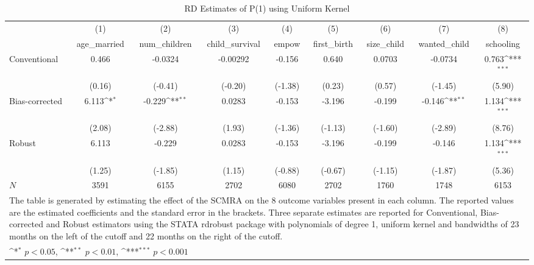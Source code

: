 \begin{table}[htbp]\centering
\def\sym#1{\ifmmode^{#1}\else\(^{#1}\)\fi}
\caption{RD Estimates of P(1) using Uniform Kernel}
\begin{tabular}{l*{8}{c}}
\toprule
            &\multicolumn{1}{c}{(1)}&\multicolumn{1}{c}{(2)}&\multicolumn{1}{c}{(3)}&\multicolumn{1}{c}{(4)}&\multicolumn{1}{c}{(5)}&\multicolumn{1}{c}{(6)}&\multicolumn{1}{c}{(7)}&\multicolumn{1}{c}{(8)}\\
            &\multicolumn{1}{c}{age\_married}&\multicolumn{1}{c}{num\_children}&\multicolumn{1}{c}{child\_survival}&\multicolumn{1}{c}{empow}&\multicolumn{1}{c}{first\_birth}&\multicolumn{1}{c}{size\_child}&\multicolumn{1}{c}{wanted\_child}&\multicolumn{1}{c}{schooling}\\
\midrule
Conventional&       0.466         &     -0.0324         &    -0.00292         &      -0.156         &       0.640         &      0.0703         &     -0.0734         &       0.763\sym{***}\\
            &      (0.16)         &     (-0.41)         &     (-0.20)         &     (-1.38)         &      (0.23)         &      (0.57)         &     (-1.45)         &      (5.90)         \\
\addlinespace
Bias-corrected&       6.113\sym{*}  &      -0.229\sym{**} &      0.0283         &      -0.153         &      -3.196         &      -0.199         &      -0.146\sym{**} &       1.134\sym{***}\\
            &      (2.08)         &     (-2.88)         &      (1.93)         &     (-1.36)         &     (-1.13)         &     (-1.60)         &     (-2.89)         &      (8.76)         \\
\addlinespace
Robust      &       6.113         &      -0.229         &      0.0283         &      -0.153         &      -3.196         &      -0.199         &      -0.146         &       1.134\sym{***}\\
            &      (1.25)         &     (-1.85)         &      (1.15)         &     (-0.88)         &     (-0.67)         &     (-1.15)         &     (-1.87)         &      (5.36)         \\
\midrule
\(N\)       &        3591         &        6155         &        2702         &        6080         &        2702         &        1760         &        1748         &        6153         \\
\bottomrule
\multicolumn{9}{l}{\footnotesize The table is generated by estimating the effect of the SCMRA on the 8 outcome variables present in each column. The reported values are the estimated coefficients and the standard error in the brackets. Three separate estimates are reported for Conventional, Bias-corrected and Robust estimators using the STATA rdrobust package with polynomials of degree 1, uniform kernel and bandwidths of 23 months on the left of the cutoff and 22 months on the right of the cutoff.}\\
\multicolumn{9}{l}{\footnotesize \sym{*} \(p<0.05\), \sym{**} \(p<0.01\), \sym{***} \(p<0.001\)}\\
\end{tabular}
\end{table}

